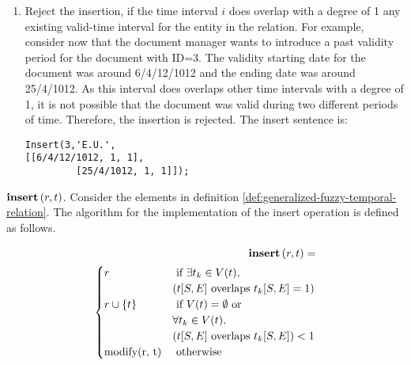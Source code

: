 \begin{enumerate}
\begin{enumerate}
	\item Reject the insertion, if the time interval $i$ does overlap with a degree of 1 any existing valid-time interval for the entity in the relation. For example, consider now that the document manager wants to introduce a past validity period for the document with ID=3. The validity starting date for the document was around 6/4/12/1012 and the ending date was around 25/4/1012. As this interval does overlaps other time intervals with a degree of 1, it is not possible that the document was valid during two different periods of time. Therefore, the insertion is rejected. The insert sentence is:

	      \begin{verbatim}
Insert(3,'E.U.',
[[6/4/12/1012, 1, 1],
         [25/4/1012, 1, 1]]);
	    \end{verbatim}
	\end{enumerate}

\end{enumerate}

\begin{definition}
 \emph{$\mbox{\textbf{insert}} \left(r, t \right)$}.
Consider the elements in definition \ref{def:generalized-fuzzy-temporal-relation}. The algorithm for the implementation of the insert operation is defined as follows.
\end{definition}



\begin{align}
\label{eq:insert-fuzzy-temporal}
\INS \left(r, t\right) =\\
\begin{cases}
\nonumber
r & \mbox{ if }  \exists t_k \in V(t), \\
\nonumber &\left(t[S,E] \mbox{ overlaps } t_k[S,E]=1\right)\\
\nonumber
r \cup \lbrace t \rbrace
& \mbox{ if }  V(t)=\emptyset \mbox{ or }\\
\nonumber & \forall t_k \in V(t), \\
\nonumber & \left(t[S,E] \mbox{ overlaps } t_k[S,E]\right) < 1\\
% 
\mbox{modify(r, t)} & \mbox{ otherwise }    %
\end{cases} 	
\end{align}




